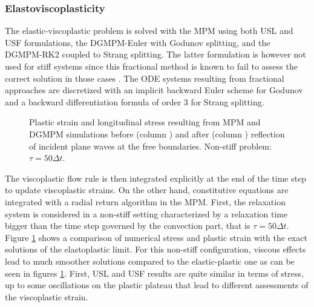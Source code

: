 \subsubsection{Elastoviscoplasticity}
The elastic-viscoplastic problem is solved with the MPM using both USL and USF formulations, the DGMPM-Euler with Godunov splitting, and the DGMPM-RK2 coupled to Strang splitting.
The latter formulation is however not used for stiff systems since this fractional method is known to fail to assess the correct solution in those cases \cite{Thomas_EVP,Leveque_stiff}.
The ODE systems resulting from fractional approaches are discretized with an implicit backward Euler scheme for Godunov and a backward differentiation formula of order 3 for Strang splitting.
\begin{figure}[h!]
  \centering
  { \label{subfig:evp_nonstiff1}}
  { \label{subfig:evp_nonstiff3}}
  {}
  \caption{Plastic strain and longitudinal stress resulting from MPM and DGMPM simulations before (column ) and after (column ) reflection of incident plane waves at the free boundaries. Non-stiff problem: $\tau=50\Delta t$.}
  \label{fig:nonstiff_elastoviscoplastic_RP}
\end{figure}
The viscoplastic flow rule is then integrated explicitly at the end of the time step to update viscoplastic strains.
On the other hand, constitutive equations are integrated with a radial return algorithm \cite{Simo} in the MPM.
First, the relaxation system is considered in a non-stiff setting characterized by a relaxation time bigger than the time step governed by the convection part, that is $\tau=50\Delta t$.
Figure \ref{fig:nonstiff_elastoviscoplastic_RP} shows a comparison of numerical stress and plastic strain with the exact solutions of the elastoplastic limit.
For this non-stiff configuration, viscous effects lead to much smoother solutions compared to the elastic-plastic one as can be seen in figures \ref{fig:nonstiff_elastoviscoplastic_RP}.
First, USL and USF results are quite similar in terms of stress, up to some oscillations on the plastic plateau that lead to different assessments of the viscoplastic strain. 

